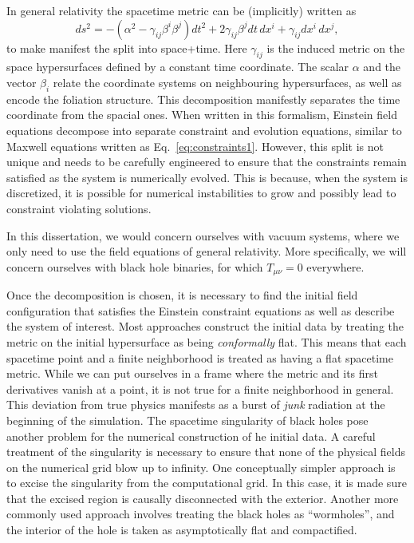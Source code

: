 In general relativity the spacetime metric can be (implicitly) written as
%
\begin{equation*}
ds^2 = -(\alpha^{2}-\gamma_{ij}\beta^{i}\beta^{j})dt^{2}
   + 2 \gamma_{ij}\beta^{j}dt\,dx^{i}
   + \gamma_{ij}dx^{i}\,dx^{j}, 
\end{equation*}
%
to make manifest the split into space+time. Here $\gamma_{ij}$ is the induced 
metric on the space hypersurfaces defined by a constant time coordinate. 
The scalar $\alpha$ and the vector $\beta_i$ relate the coordinate systems on
neighbouring hypersurfaces, as well as encode the foliation structure.
This decomposition manifestly separates the time coordinate from the spacial
ones. When written in this formalism, Einstein field equations decompose into
separate constraint and evolution equations, similar to Maxwell equations
written as Eq.~\ref{eq:constraints1}.
However, this split is not unique and needs to be carefully engineered to 
ensure that the constraints remain satisfied as the system is numerically 
evolved. This is because, when the system is discretized, it is possible for
numerical instabilities to grow and possibly lead to constraint violating 
solutions.

In this dissertation, we would concern ourselves with vacuum systems, where 
we only need to use the field equations of general relativity. More 
specifically, we will concern ourselves with black hole binaries, for which 
$T_{\mu\nu}=0$ everywhere. 

% 
Once the decomposition is chosen, it is necessary to find the initial 
field configuration that satisfies the Einstein constraint equations as well as
describe the system of interest. Most approaches construct the initial 
data by treating the metric on the initial hypersurface as being 
{\it conformally} flat. This means that each spacetime point and a finite 
neighborhood is treated as having a flat spacetime metric.
While we can put ourselves in a frame where the metric and its first
derivatives vanish at a point, it is not true for a finite neighborhood in 
general.
This deviation from true physics manifests as a burst of {\it junk}
radiation at the beginning of the simulation. 
%
The spacetime singularity of black holes pose another problem for the 
numerical construction of he initial data. A careful treatment of the 
singularity is necessary to ensure that none of the physical fields on the
numerical grid blow up to infinity. One conceptually simpler approach is to 
excise the singularity from the computational grid. In this case, it is
made sure that the excised region is causally disconnected with the exterior. 
Another more commonly used approach involves treating the black holes as 
``wormholes'', and the interior of the hole is taken as asymptotically
flat and compactified. 

